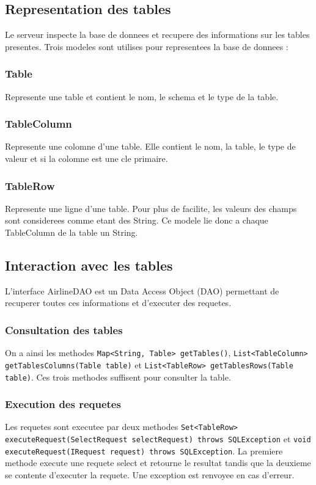 \subsection{Representation des tables}
Le serveur inspecte la base de donnees et recupere des informations sur les tables presentes. Trois modeles sont utilises pour representees la base de donnees :
\subsubsection{Table}
Represente une table et contient le nom, le schema et le type de la table.
\subsubsection{TableColumn}
Represente une colomne d'une table. Elle contient le nom, la table, le type de valeur et si la colomne est une cle primaire.
\subsubsection{TableRow}
Represente une ligne d'une table. Pour plus de facilite, les valeurs des champs sont considerees comme etant des String. Ce modele lie donc a chaque TableColumn de la table un String.
\subsection{Interaction avec les tables}
L'interface AirlineDAO est un Data Access Object (DAO) permettant de recuperer toutes ces informations et d'executer des requetes. 
\subsubsection{Consultation des tables}
On a ainsi les methodes \texttt{Map<String, Table> getTables()}, \texttt{List<TableColumn> getTablesColumns(Table table)} et \texttt{List<TableRow> getTablesRows(Table table)}. Ces trois methodes suffisent pour consulter la table.
\subsubsection{Execution des requetes}
Les requetes sont executee par deux methodes \texttt{Set<TableRow> executeRequest(SelectRequest selectRequest) throws SQLException} et \texttt{void executeRequest(IRequest request) throws SQLException}. La premiere methode execute une requete select et retourne le resultat tandis que la deuxieme se contente d'executer la requete. Une exception est renvoyee en cas d'erreur.

